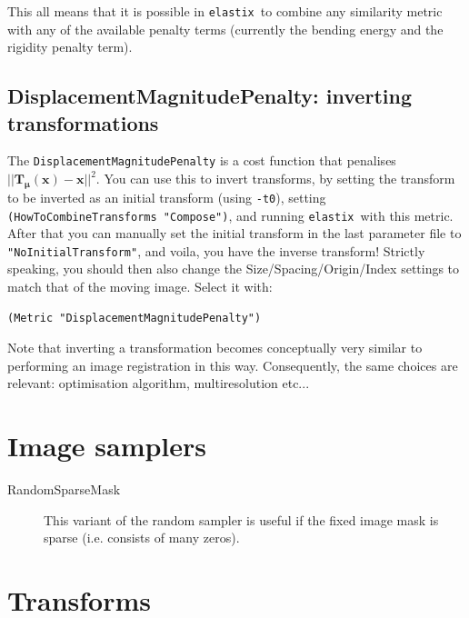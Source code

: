 \documentclass[]{report}
\newcommand{\elastix}{\texttt{elastix}}
\newcommand{\vx}{\bm{x}}
\newcommand{\vmu}{\bm{\mu}}
\newcommand{\vTm}{\bm{T}_{\vmu}}
\begin{document}
This all means that it is possible in \elastix\ to combine any similarity
metric with any of the available penalty terms (currently the bending energy
and the rigidity penalty term).

\subsection{DisplacementMagnitudePenalty: inverting transformations}

The \texttt{DisplacementMagnitudePenalty} is a cost function that
penalises $||\vTm(\vx)-\vx||^2$. You can use this to invert
transforms, by setting the transform to be inverted as an initial
transform (using \texttt{-t0}), setting
\texttt{(HowToCombineTransforms "Compose")}, and running \elastix\
with this metric. After that you can manually set the initial
transform in the last parameter file to
\texttt{"NoInitialTransform"}, and voila, you have the inverse
transform! Strictly speaking, you should then also change the
Size/Spacing/Origin/Index settings to match that of the moving
image. Select it with:
\begin{verbatim}
(Metric "DisplacementMagnitudePenalty")
\end{verbatim}
Note that inverting a transformation becomes conceptually very similar to
performing an image registration in this way. Consequently, the same choices
are relevant: optimisation algorithm, multiresolution etc...

\section{Image samplers}

\begin{description}
\item[RandomSparseMask] This variant of the random sampler is useful if the
    fixed image mask is sparse (i.e. consists of many zeros).
\end{description}

\section{Transforms}
\end{document}
